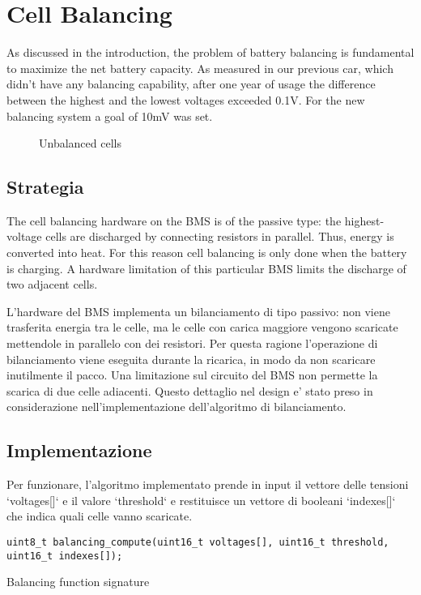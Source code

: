 \chapter{Cell Balancing}
\label{cha:balancing}
As discussed in the introduction, the problem of battery balancing is fundamental to maximize the net battery capacity. As measured in our previous car, which didn't have any balancing capability, after one year of usage the difference between the highest and the lowest voltages exceeded 0.1V.
For the new balancing system a goal of 10mV was set.

\begin{figure}[h]
    \centering
    
    \caption{Unbalanced cells}
    \label{fig:imbalance}
\end{figure}

\section{Strategia}
The cell balancing hardware on the BMS is of the passive type: the highest-voltage cells are discharged by connecting resistors in parallel. Thus, energy is converted into heat. For this reason cell balancing is only done when the battery is charging.
A hardware limitation of this particular BMS limits the discharge of two adjacent cells.

L'hardware del BMS implementa un bilanciamento di tipo passivo: non viene trasferita energia tra le celle, ma le celle con carica maggiore vengono scaricate mettendole in parallelo con dei resistori. Per questa ragione l'operazione di bilanciamento viene eseguita durante la ricarica, in modo da non scaricare inutilmente il pacco.
Una limitazione sul circuito del BMS non permette la scarica di due celle adiacenti. Questo dettaglio nel design e' stato preso in considerazione nell'implementazione dell'algoritmo di bilanciamento.

\section {Implementazione}
Per funzionare, l'algoritmo implementato prende in input il vettore delle tensioni `voltages[]` e il valore `threshold` e restituisce un vettore di booleani `indexes[]` che indica quali celle vanno scaricate.
\begin{listing}
    \begin{verbatim}
uint8_t balancing_compute(uint16_t voltages[], uint16_t threshold, uint16_t indexes[]);
\end{verbatim}
    \caption{Balancing function signature}
    \label{listing:bal_signature}
\end{listing}

